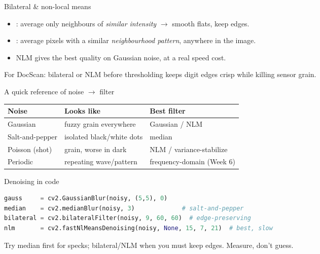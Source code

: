 \documentclass[10pt,aspectratio=169]{beamer}
\begin{document}
\begin{frame}{Bilateral \& non-local means}
  \begin{itemize}
    \item {}: average only neighbours of \emph{similar intensity} $\rightarrow$ smooth flats, keep edges.
    \item {}: average pixels with a similar \emph{neighbourhood pattern}, anywhere in the image.
    \item NLM gives the best quality on Gaussian noise, at a real speed cost.
  \end{itemize}
  \begin{goodbox}
    For DocScan: bilateral or NLM before thresholding keeps digit edges crisp while killing sensor grain.
  \end{goodbox}
\end{frame}

\begin{frame}{A quick reference of noise $\rightarrow$ filter}
  \begin{center}
  \begin{tabular}{@{}lll@{}}
    \toprule
    \textbf{Noise} & \textbf{Looks like} & \textbf{Best filter} \\
    \midrule
    Gaussian & fuzzy grain everywhere & Gaussian / NLM \\
    Salt-and-pepper & isolated black/white dots & median \\
    Poisson (shot) & grain, worse in dark & NLM / variance-stabilize \\
    Periodic & repeating wave/pattern & frequency-domain (Week 6) \\
    \bottomrule
  \end{tabular}
  \end{center}
\end{frame}

\begin{frame}[fragile]{Denoising in code}
\begin{lstlisting}[language=Python]
gauss     = cv2.GaussianBlur(noisy, (5,5), 0)
median    = cv2.medianBlur(noisy, 3)             # salt-and-pepper
bilateral = cv2.bilateralFilter(noisy, 9, 60, 60)  # edge-preserving
nlm       = cv2.fastNlMeansDenoising(noisy, None, 15, 7, 21)  # best, slow
\end{lstlisting}
  \begin{infobox}
    Try median first for specks; bilateral/NLM when you must keep edges. Measure, don't guess.
  \end{infobox}
\end{frame}
\end{document}
